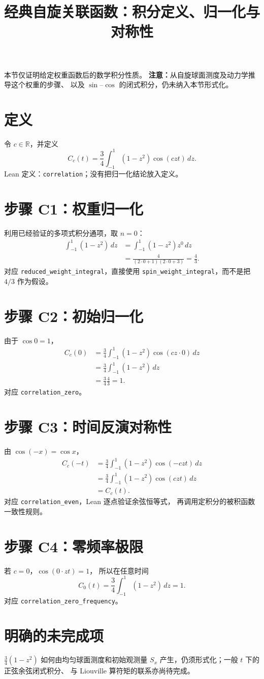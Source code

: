 \documentclass[UTF8,11pt]{ctexart}
\title{经典自旋关联函数：积分定义、归一化与对称性}
\date{}
\begin{document}
\maketitle

\noindent 本节仅证明给定权重函数后的数学积分性质。
\textbf{注意：}从自旋球面测度及动力学推导这个权重的步骤、
以及 $\sin$--$\cos$ 的闭式积分，仍未纳入本节形式化。

\section{定义}
令 $c\in\mathbb R$，并定义
\[
 C_c(t)=\frac{3}{4}\int_{-1}^{1}(1-z^2)\cos(czt)\,dz.
\]
Lean 定义：\texttt{correlation}；没有把归一化结论放入定义。

\section{步骤 C1：权重归一化}
利用已经验证的多项式积分通项，取 $n=0$：
\[
 \begin{aligned}
 \int_{-1}^{1}(1-z^2)\,dz
 &=\int_{-1}^{1}(1-z^2)z^{0}\,dz\\
 &=\frac{4}{(2\cdot0+1)(2\cdot0+3)}
 =\frac43.
 \end{aligned}
\]
对应 \texttt{reduced\_weight\_integral}，直接使用
\texttt{spin\_weight\_integral}，而不是把 $4/3$ 作为假设。

\section{步骤 C2：初始归一化}
由于 $\cos 0=1$，
\[
 \begin{aligned}
 C_c(0)
 &=\frac34\int_{-1}^{1}(1-z^2)\cos(cz\cdot0)\,dz\\
 &=\frac34\int_{-1}^{1}(1-z^2)\,dz\\
 &=\frac34\frac43=1.
 \end{aligned}
\]
对应 \texttt{correlation\_zero}。

\section{步骤 C3：时间反演对称性}
由 $\cos(-x)=\cos x$，
\[
 \begin{aligned}
 C_c(-t)
 &=\frac34\int_{-1}^{1}(1-z^2)\cos(-czt)\,dz\\
 &=\frac34\int_{-1}^{1}(1-z^2)\cos(czt)\,dz\\
 &=C_c(t).
 \end{aligned}
\]
对应 \texttt{correlation\_even}，Lean 逐点验证余弦恒等式，
再调用定积分的被积函数一致性规则。

\section{步骤 C4：零频率极限}
若 $c=0$，$\cos(0\cdot zt)=1$，
所以在任意时间
\[
 C_0(t)=\frac34\int_{-1}^{1}(1-z^2)\,dz=1.
\]
对应 \texttt{correlation\_zero\_frequency}。

\section{明确的未完成项}
$\frac{3}{4}(1-z^2)$ 如何由均匀球面测度和初始观测量 $S_x$
产生，仍须形式化；一般 $t$ 下的正弦余弦闭式积分、
与 Liouville 算符矩的联系亦尚待完成。
\end{document}
